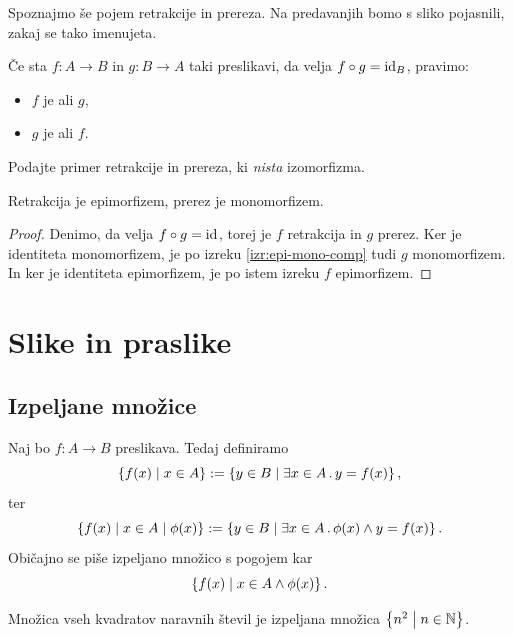 Spoznajmo še pojem retrakcije in prereza. Na predavanjih bomo s sliko pojasnili, zakaj se tako imenujeta.

\begin{definicija}
  \label{def:retrakcija-prerez}
  Če sta $f : A \to B$ in $g : B \to A$ taki preslikavi, da velja $f \circ g = \id[B]$, pravimo:
  \begin{itemize}
  \item $f$ je  ali  $g$,
  \item $g$ je  ali  $f$.
  \end{itemize}
\end{definicija}

\begin{vaja}
  Podajte primer retrakcije in prereza, ki \emph{nista} izomorfizma.
\end{vaja}

\begin{izrek}
  Retrakcija je epimorfizem, prerez je monomorfizem.
\end{izrek}

\begin{proof}
  Denimo, da velja $f \circ g = \id$, torej je $f$ retrakcija in $g$ prerez. Ker je identiteta monomorfizem, je po izreku \ref{izr:epi-mono-comp} tudi $g$ monomorfizem. In ker je identiteta epimorfizem, je po istem izreku $f$ epimorfizem.
\end{proof}

\section{Slike in praslike}
\label{sec:slike-in-praslike}

\subsection{Izpeljane množice}
\label{sec:izpeljane-mnozice}

Naj bo $f : A \to B$ preslikava. Tedaj definiramo 
%
\begin{equation*}
  \set{ f(x) \such x \in A }
  \defeq \set{ y \in B \such \some{x \in A} y = f(x) },
\end{equation*}
%
ter 
%
\begin{equation*}
  \set{ f(x) \such x \in A \such \phi(x) }
  \defeq \set{ y \in B \such \some{x \in A} \phi(x) \land y = f(x) }.
\end{equation*}
%
Običajno se piše izpeljano množico s pogojem kar
%
\begin{equation*}
  \set{ f(x) \such x \in A \land \phi(x) }.
\end{equation*}
%
\begin{zgled}
  Množica vseh kvadratov naravnih števil je izpeljana množica $\set{ n^2 \such n \in \NN }$.
\end{zgled}



